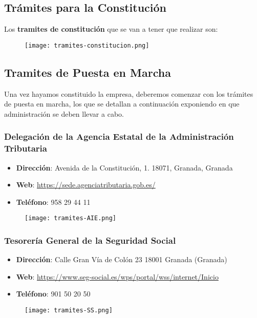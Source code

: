 \subsection{Trámites para la Constitución}
Los\textbf{ tramites de constitución} que se van a tener que realizar son:
\begin{figure}[H]
    \centering
    \texttt{[image: tramites-constitucion.png]}
\end{figure}

\subsection{Tramites de Puesta en Marcha}
Una vez hayamos constituido la empresa, deberemos comenzar con los trámites de puesta en marcha, los que se detallan a continuación exponiendo en que administración se deben llevar a cabo.

\subsubsection*{Delegación de la Agencia Estatal de la Administración Tributaria}
\begin{itemize}
    \item \textbf{Dirección}: Avenida de la Constitución, 1. 18071, Granada, Granada
    \item \textbf{Web}: \url{https://sede.agenciatributaria.gob.es/}
    \item \textbf{Teléfono}: 958 29 44 11
\end{itemize}

\begin{figure}[H]
    \centering
    \texttt{[image: tramites-AIE.png]}
\end{figure}

\subsubsection*{Tesorería General de la Seguridad Social}
\begin{itemize}
    \item \textbf{Dirección}: Calle Gran Vía de Colón 23 18001 Granada (Granada)
    \item \textbf{Web}: \url{https://www.seg-social.es/wps/portal/wss/internet/Inicio}
    \item \textbf{Teléfono}: 901 50 20 50
\end{itemize}

\begin{figure}[H]
    \centering
    \texttt{[image: tramites-SS.png]}
\end{figure}

